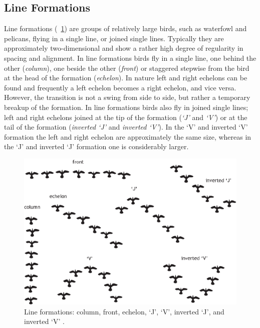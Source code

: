 \subsection{Line Formations}
Line formations (\fig~\ref{fig:lineFormations}) are groups of relatively large birds, such as waterfowl and pelicans, flying in a single line, or joined single lines. Typically they are approximately two-dimensional and show a rather high degree of regularity in spacing and alignment. In line formations birds fly in a single line, one behind the other (\emph{column}), one beside the other ({\em front\/}) or staggered stepwise from the bird at the head of the formation (\emph{echelon}). In nature left and right echelons can be found and 
frequently a left echelon becomes a right echelon, and vice versa. However, the transition is not a swing from side to side, but rather a temporary breakup of the formation. In line formations birds also fly in joined single lines; left and right echelons joined at the tip of the formation (\emph{`J'} and \emph{`V'}) or at the tail of the formation (\emph{inverted `J'} and \emph{inverted `V'}). In the `V' and inverted `V' formation the left and right echelon are approximately the same size, whereas in the `J' and inverted `J' formation one is considerably larger.

\begin{figure}%
\includegraphics{fig[lineFormations]}
\caption{Line formations: column, front, echelon, `J', `V', inverted `J', and inverted `V' \cite{heppner:1974a}.}
\label{fig:lineFormations}
\end{figure}

